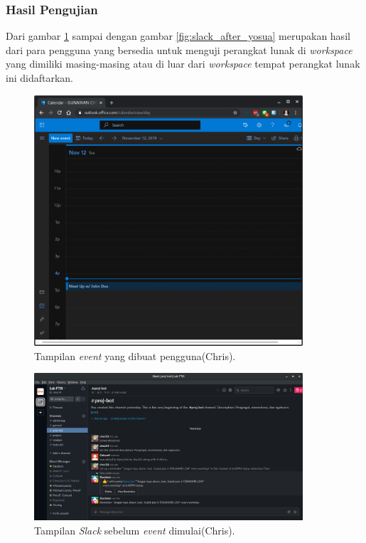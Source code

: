 \subsubsection{Hasil Pengujian}
Dari gambar \ref{fig:outlook_chris} sampai dengan gambar \ref{fig:slack_after_yosua} merupakan hasil dari para pengguna yang bersedia untuk menguji perangkat lunak di \textit{workspace} yang dimiliki masing-masing atau di luar dari \textit{workspace} tempat perangkat lunak ini didaftarkan. 

\begin{figure}[h]
  \includegraphics[width=10cm]{./Gambar/PengujianChris/Outlook.png}
  \centering
  \caption{Tampilan \textit{event} yang dibuat pengguna(Chris).}
  \label{fig:outlook_chris}
\end{figure}

\begin{figure}[h]
  \includegraphics[width=10cm]{./Gambar/PengujianChris/Slack_Before.png}
  \centering
  \caption{Tampilan \textit{Slack} sebelum \textit{event} dimulai(Chris).}
  \label{fig:slack_before_chris}
\end{figure}

